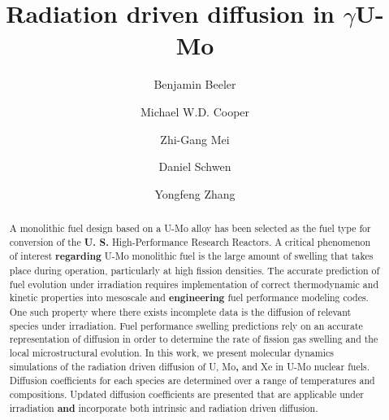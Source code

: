 \documentclass[review]{elsarticle}
\providecommand{\DIFaddtex}[1]{{\bf #1}} %
\providecommand{\DIFdeltex}[1]{} %
\providecommand{\DIFaddbegin}{\protect\color{blue}} %
\providecommand{\DIFaddend}{\protect\color{black}} %
\providecommand{\DIFdelbegin}{\protect\color{red}} %
\providecommand{\DIFdelend}{\protect\color{black}} %
\providecommand{\DIFadd}[1]{\texorpdfstring{\DIFaddtex{#1}}{#1}} %
\providecommand{\DIFdel}[1]{\texorpdfstring{\DIFdeltex{#1}}{}} %
\newcommand{\DIFscaledelfig}{0.5}
\newlength{\DIFdelgraphicswidth} %
\newlength{\DIFdelgraphicsheight} %
\newcommand{\DIFaddincludegraphics}[2][]{{\color{blue}\fbox{\DIFOincludegraphics[#1]{#2}}}} %
\newcommand{\DIFdelincludegraphics}[2][]{%
\sbox{\DIFdelgraphicsbox}{\DIFOincludegraphics[#1]{#2}}%
\settoboxwidth{\DIFdelgraphicswidth}{\DIFdelgraphicsbox} %
\settoboxtotalheight{\DIFdelgraphicsheight}{\DIFdelgraphicsbox} %
\scalebox{\DIFscaledelfig}{%
\parbox[b]{\DIFdelgraphicswidth}{\usebox{\DIFdelgraphicsbox}\\[-\baselineskip] \rule{\DIFdelgraphicswidth}{0em}}\llap{\resizebox{\DIFdelgraphicswidth}{\DIFdelgraphicsheight}{%
\setlength{\unitlength}{\DIFdelgraphicswidth}%
\begin{picture}(1,1)%
\thicklines\linethickness{2pt} %
{\color[rgb]{1,0,0}\put(0,0){\framebox(1,1){}}}%
{\color[rgb]{1,0,0}\put(0,0){\line( 1,1){1}}}%
{\color[rgb]{1,0,0}\put(0,1){\line(1,-1){1}}}%
\end{picture}%
}\hspace*{3pt}}} %
} %
\DeclareRobustCommand{\DIFaddbegin}{\DIFOaddbegin \let\includegraphics\DIFaddincludegraphics} %
\DeclareRobustCommand{\DIFaddend}{\DIFOaddend \let\includegraphics\DIFOincludegraphics} %
\DeclareRobustCommand{\DIFdelbegin}{\DIFOdelbegin \let\includegraphics\DIFdelincludegraphics} %
\DeclareRobustCommand{\DIFdelend}{\DIFOaddend \let\includegraphics\DIFOincludegraphics} %
\begin{document}
\begin{frontmatter}
\title{Radiation driven diffusion in $\gamma$U-Mo}

\author[ncsu,inl]{Benjamin Beeler}
\author[lanl]{Michael W.D. Cooper}
\author[anl]{Zhi-Gang Mei}
\author[inl]{Daniel Schwen}
\author[wisc,inl]{Yongfeng Zhang}
\address[ncsu]{North Carolina State University, Raleigh, NC 27695}
\address[inl]{Idaho National Laboratory, Idaho Falls, ID 83415}
\address[lanl]{Los Alamos National Laboratory, Los Alamos, NM 87545}
\address[anl]{Argonne National Laboratory, Lemont, IL 60439}
\address[wisc]{University of Wisconsin-Madison, Madison, WI 53715}

\begin{abstract}
A monolithic fuel design based on a U-Mo alloy has been selected as the fuel type for conversion of the \DIFdelbegin \DIFdel{United States }\DIFdelend \DIFaddbegin \DIFadd{U. S. }\DIFaddend High-Performance Research Reactors\DIFdelbegin \DIFdel{(HPRRs)}\DIFdelend . A critical phenomenon of interest \DIFdelbegin \DIFdel{with }\DIFdelend \DIFaddbegin \DIFadd{regarding }\DIFaddend U-Mo monolithic fuel is the large amount of swelling that takes place during operation, particularly at high fission densities. The accurate prediction of fuel evolution under irradiation requires implementation of correct thermodynamic and kinetic properties into mesoscale and \DIFdelbegin \DIFdel{continuum level }\DIFdelend \DIFaddbegin \DIFadd{engineering }\DIFaddend fuel performance modeling codes. One such property where there exists incomplete data is the diffusion of relevant species under irradiation. Fuel performance swelling predictions rely on an accurate representation of diffusion in order to determine the rate of fission gas swelling and the local microstructural evolution. In this work, we present molecular dynamics simulations of the radiation driven diffusion of U, Mo\DIFaddbegin \DIFadd{, }\DIFaddend and Xe in U-Mo nuclear fuels. Diffusion coefficients for each species are determined over a range of temperatures and compositions. Updated diffusion coefficients are presented that are applicable under irradiation \DIFdelbegin \DIFdel{that }\DIFdelend \DIFaddbegin \DIFadd{and }\DIFaddend incorporate both intrinsic and radiation driven diffusion. 


\end{abstract}
\end{frontmatter}

\linenumbers
\modulolinenumbers[5]
\end{document}
